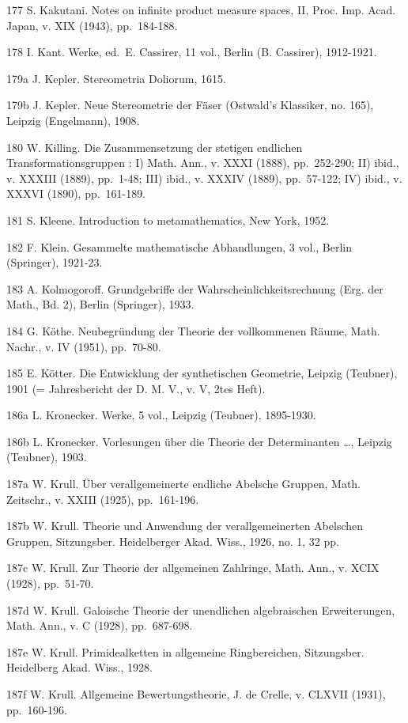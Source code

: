177 S. Kakutani. Notes on infinite product measure spaces, II, Proc. Imp. Acad. Japan, v. XIX (1943), pp.~184-188.

178 I. Kant. Werke, ed.~E. Cassirer, 11 vol., Berlin (B. Cassirer), 1912-1921.

179a J. Kepler. Stereometria Doliorum, 1615.

179b J. Kepler. Neue Stereometrie der Fäser (Ostwald's Klassiker, no. 165), Leipzig (Engelmann), 1908.

180 W. Killing. Die Zusammensetzung der stetigen endlichen Transformationsgruppen : I) Math. Ann., v. XXXI (1888), pp.~252-290; II) ibid., v. XXXIII (1889), pp.~1-48; III) ibid., v. XXXIV (1889), pp.~57-122; IV) ibid., v. XXXVI (1890), pp.~161-189.

181 S. Kleene. Introduction to metamathematics, New York, 1952.

182 F. Klein. Gesammelte mathematische Abhandlungen, 3 vol., Berlin (Springer), 1921-23.

183 A. Kolmogoroff. Grundgebriffe der Wahrscheinlichkeitsrechnung (Erg. der Math., Bd. 2), Berlin (Springer), 1933.

184 G. Köthe. Neubegründung der Theorie der vollkommenen Räume, Math. Nachr., v. IV (1951), pp.~70-80.

185 E. Kötter. Die Entwicklung der synthetischen Geometrie, Leipzig (Teubner), 1901 (= Jahresbericht der D. M. V., v. V, 2tes Heft).

186a L. Kronecker. Werke, 5 vol., Leipzig (Teubner), 1895-1930.

186b L. Kronecker. Vorlesungen über die Theorie der Determinanten \ldots, Leipzig (Teubner), 1903.

187a W. Krull. Über verallgemeinerte endliche Abelsche Gruppen, Math. Zeitschr., v. XXIII (1925), pp.~161-196.

187b W. Krull. Theorie und Anwendung der verallgemeinerten Abelschen Gruppen, Sitzungsber. Heidelberger Akad. Wiss., 1926, no. 1, 32 pp.

187c W. Krull. Zur Theorie der allgemeinen Zahlringe, Math. Ann., v. XCIX (1928), pp.~51-70.

187d W. Krull. Galoische Theorie der unendlichen algebraischen Erweiterungen, Math. Ann., v. C (1928), pp.~687-698.

187e W. Krull. Primidealketten in allgemeine Ringbereichen, Sitzungsber. Heidelberg Akad. Wiss., 1928.

187f W. Krull. Allgemeine Bewertungstheorie, J. de Crelle, v. CLXVII (1931), pp.~160-196.

